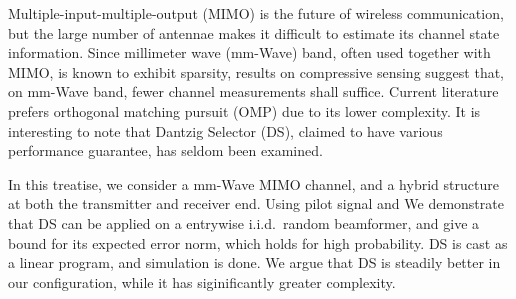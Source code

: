 
\starttitle [title={Abstract}]

Multiple-input-multiple-output (MIMO) is the future of wireless communication, but the large number of antennae makes it difficult to estimate its channel state information.
Since millimeter wave (mm-Wave) band, often used together with MIMO, is known to exhibit sparsity, results on compressive sensing suggest that, on mm-Wave band, fewer channel measurements shall suffice.
Current literature prefers orthogonal matching pursuit (OMP) due to its lower complexity.
It is interesting to note that Dantzig Selector (DS), claimed to have various performance guarantee, has seldom been examined.

In this treatise, we consider a mm-Wave MIMO channel, and a hybrid structure at both the transmitter and receiver end.
Using pilot signal and 
We demonstrate that DS can be applied on a entrywise i.i.d.\ random beamformer, and give a bound for its expected error norm, which holds for high probability.
DS is cast as a linear program, and simulation is done.
We argue that DS is steadily better in our configuration, while it has siginificantly greater complexity.


\stoptitle
